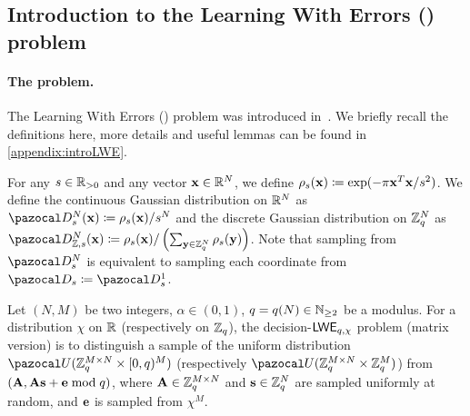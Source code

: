 \subsection{Introduction to the Learning With Errors (\LWE{}) problem}\label{subsec:LWE}

\paragraph{The \LWE{} problem.}
The Learning With Errors (\LWE{}) problem was introduced in~\cite{Regev2005}. We briefly recall the definitions here, more details and useful lemmas can be found in \cref{appendix:introLWE}.

  \begin{definition}
    For any $s \in \mathbb{R}_{>0}$ and any vector $\mathbf{x} \in \mathbb{R}^N$, we define $\rho_s(\mathbf{x}) \coloneqq \exp(-\pi \mathbf{x}^T \mathbf{x}/s^2)$. We define the continuous Gaussian distribution on $\mathbb{R}^N$ as $\cD_{s}^N(\vect{x}) \eqdef \rho_s(\vect{x})/s^N$ and the discrete Gaussian distribution on $\mathbb{Z}_q^N$ as $\cD_{\Z,s}^N(\vect{x}) \eqdef \rho_s(\vect{x})/\left(\sum_{\vect{y} \in \Z_q^N} \rho_s(\vect{y})\right)$. Note that sampling from $\cD_s^N$ is equivalent to sampling each coordinate from $\cD_s \eqdef \cD_s^1$.
  \end{definition}

  \begin{definition}
    Let $(N,M)$ be two integers, $\alpha \in (0,1)$, $q = q(N) \in \mathbb{N}_{\geq 2}$ be a modulus. For a distribution $\chi$ on $\mathbb{R}$ (respectively on $\mathbb{Z}_q$), the decision-$\textsf{LWE}{}_{q,\chi}$ problem (matrix version) is to distinguish a sample of the uniform distribution $\cU(\Z_q^{M \times N} \times [0,q)^M)$ (respectively $\cU(\Z_q^{M \times N} \times \Z_q^M)$) from $(\mathbf{A}, \mathbf{A}\mathbf{s}+\mathbf{e} \bmod q)$, where $\mathbf{A} \in \mathbb{Z}_q^{M \times N}$ and $\mathbf{s} \in \mathbb{Z}_q^N$ are sampled uniformly at random, and $\mathbf{e}$ is sampled from $\chi^M$.
  \end{definition}


